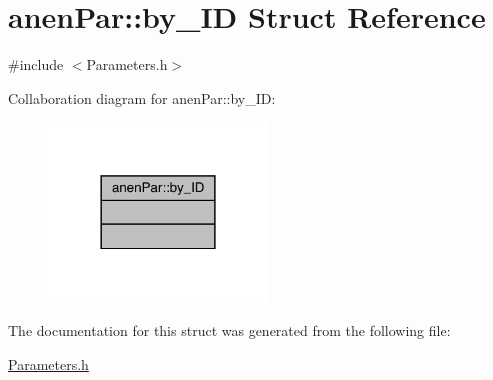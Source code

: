 \hypertarget{structanen_par_1_1by___i_d}{}\section{anen\+Par\+:\+:by\+\_\+\+ID Struct Reference}
\label{structanen_par_1_1by___i_d}


{\ttfamily \#include $<$Parameters.\+h$>$}



Collaboration diagram for anen\+Par\+:\+:by\+\_\+\+ID\+:\nopagebreak
\begin{figure}[H]
\begin{center}
\leavevmode
\includegraphics[width=165pt]{structanen_par_1_1by___i_d__coll__graph}
\end{center}
\end{figure}


The documentation for this struct was generated from the following file\+:\begin{DoxyCompactItemize}
\item 
\mbox{\hyperlink{_parameters_8h}{Parameters.\+h}}\end{DoxyCompactItemize}
